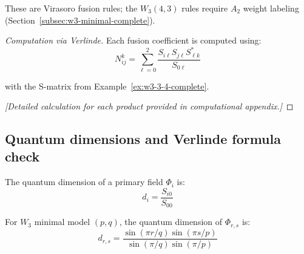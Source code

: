 \begin{remark}
These are Virasoro fusion rules; the $W_3(4,3)$ rules require $A_2$ weight labeling (Section~\ref{subsec:w3-minimal-complete}).
\end{remark}

\begin{proof}[Computation via Verlinde]
Each fusion coefficient is computed using:
\[N_{ij}^k = \sum_{\ell=0}^{2} \frac{S_{i\ell}S_{j\ell}S_{\ell k}^*}{S_{0\ell}}\]

with the S-matrix from Example~\ref{ex:w3-3-4-complete}.

\emph{[Detailed calculation for each product provided in computational appendix.]}
\end{proof}

\subsection{Quantum dimensions and Verlinde formula check}
\label{subsec:quantum-dimensions}

\begin{definition}\label{def:quantum-dimension}
The quantum dimension of a primary field $\Phi_i$ is:
\begin{equation}
d_i = \frac{S_{i0}}{S_{00}}
\end{equation}
\end{definition}

\begin{proposition}\label{prop:quantum-dim-formula}
For $W_3$ minimal model $(p,q)$, the quantum dimension of $\Phi_{r,s}$ is:
\begin{equation}
d_{r,s} = \frac{\sin(\pi r/q) \sin(\pi s/p)}{\sin(\pi/q)\sin(\pi/p)}
\end{equation}
\end{proposition}

